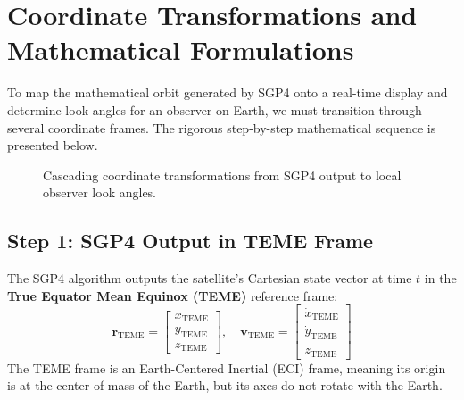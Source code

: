 \documentclass[11pt,journal,onecolumn]{IEEEtran}
\begin{document}
\section{Coordinate Transformations and Mathematical Formulations}
To map the mathematical orbit generated by SGP4 onto a real-time display and determine look-angles for an observer on Earth, we must transition through several coordinate frames. The rigorous step-by-step mathematical sequence is presented below.

\begin{figure}[htbp]
\centering
{}
\caption{Cascading coordinate transformations from SGP4 output to local observer look angles.}
\label{fig:cascade}
\end{figure}

\subsection{Step 1: SGP4 Output in TEME Frame}
The SGP4 algorithm outputs the satellite's Cartesian state vector at time $t$ in the \textbf{True Equator Mean Equinox (TEME)} reference frame:
\begin{equation}
\mathbf{r}_{\text{TEME}} = \begin{bmatrix} x_{\text{TEME}} \\ y_{\text{TEME}} \\ z_{\text{TEME}} \end{bmatrix}, \quad \mathbf{v}_{\text{TEME}} = \begin{bmatrix} \dot{x}_{\text{TEME}} \\ \dot{y}_{\text{TEME}} \\ \dot{z}_{\text{TEME}} \end{bmatrix}
\label{eq:teme_state}
\end{equation}
The TEME frame is an Earth-Centered Inertial (ECI) frame, meaning its origin is at the center of mass of the Earth, but its axes do not rotate with the Earth.
\end{document}
